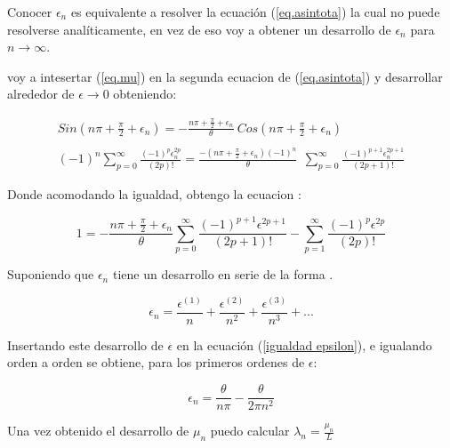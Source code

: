 Conocer $\epsilon _n $ es equivalente a resolver la ecuación (\ref{eq.asintota}) la cual no puede resolverse analíticamente, en vez de eso voy a obtener un desarrollo de $\epsilon _n $ para $n \rightarrow \infty$.

voy a intesertar (\ref{eq.mu}) en la segunda ecuacion de (\ref{eq.asintota}) y desarrollar alrededor de $\epsilon \rightarrow{0}$ obteniendo:

\begin{equation}
\begin{array}{c}
    Sin( n \pi + \frac{\pi}{2} + \epsilon _n ) = 
    - \frac{n \pi + \frac{\pi}{2} + \epsilon _n}{\theta}  \ Cos( n \pi + \frac{\pi}{2} + \epsilon _n )  \\
 \\

         (-1) ^n \sum _{p=0} ^{\infty} \frac{(-1) ^p  \epsilon _n ^{2 p }}{(2p)!} 
    =  \frac{-(n \pi + \frac{\pi}{2} + \epsilon _n) (-1) ^n}{\theta}  \  \	
     \sum _{p=0} ^{\infty} \frac{(-1) ^ {p+1} \epsilon _n ^{2 p + 1}}{(2p+1)!} 
\end{array}
\end{equation}


Donde acomodando la igualdad, obtengo la ecuacion :

\begin{equation}
    1 = 
    - \frac{n \pi + \frac{\pi}{2} + \epsilon _n }{\theta}
    \sum _{p=0} ^{ \infty } 
    \frac{(-1)^{p+1} \epsilon ^{2p+1}}{(2p+1)!}
    - \sum _{p=1} ^{\infty} \frac{(-1) ^p \epsilon ^{2p}}{(2p)!}
\label{igualdad epsilon}
\end{equation}

Suponiendo que $\epsilon _n $ tiene un desarrollo en serie de la forma .

\begin{equation}
    \epsilon _n = 
    \frac{\epsilon ^{(1)}}{n}  + 
    \frac{\epsilon ^{(2)}}{n ^2}  + 
    \frac{\epsilon ^{(3)}}{n ^3}  + ...
\label{eq.epsilon}
\end{equation}


Insertando este desarrollo de $\epsilon$ en la ecuación (\ref{igualdad epsilon}), e igualando orden a orden se obtiene, para los primeros ordenes de $\epsilon$:

\begin{equation}
    \epsilon _n = \frac{\theta}{n \pi} 
     - \frac{ \theta}{2 \pi n ^2 } 
\label{epsilons}
\end{equation}

Una vez obtenido el desarrollo de $\mu _n $ puedo calcular $\lambda _n = \frac{\mu _n }{L}  $ 



